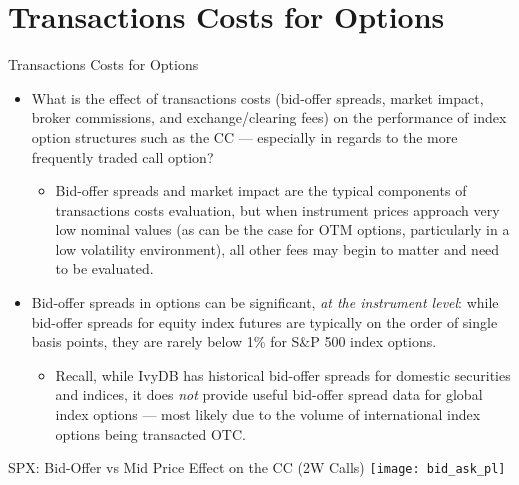 \documentclass{beamer}
\begin{document}
\section{Transactions Costs for Options}
\begin{frame}{Transactions Costs for Options}
\begin{itemize}

\item What is the effect of transactions costs (bid-offer spreads, market impact, broker commissions, and exchange/clearing fees) on the performance of index option structures such as the CC --- especially in regards to the more frequently traded call option?
\begin{itemize}
\item Bid-offer spreads and market impact are the typical components of transactions costs evaluation, but when instrument prices approach very low nominal values (as can be the case for OTM options, particularly in a low volatility environment), all other fees may begin to matter and need to be evaluated.
\end{itemize}
\vfill
\item Bid-offer spreads in options can be significant, {\em at the instrument level}: while bid-offer spreads for equity index futures are typically on the order of single basis points, they are rarely below 1\% for S\&P 500 index options.
\begin{itemize}
\item Recall, while IvyDB has historical bid-offer spreads for domestic securities and indices, it does {\em not} provide useful bid-offer spread data for global index options --- most likely due to the volume of international index options being transacted OTC.
\end{itemize}
\end{itemize}
\end{frame}

\begin{frame}{\large SPX: Bid-Offer vs Mid Price Effect on the CC (2W Calls)}
\texttt{[image: bid\_ask\_pl]}
\end{frame}
\end{document}
